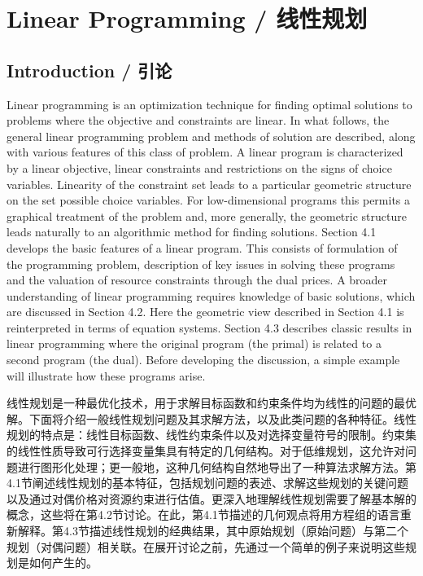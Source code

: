 
\chapter{Linear Programming / 线性规划}

\section{Introduction / 引论}

\begin{original}
Linear programming is an optimization technique for finding optimal solutions to problems where the objective and constraints are linear. In what follows, the general linear programming problem and methods of solution are described, along with various features of this class of problem. A linear program is characterized by a linear objective, linear constraints and restrictions on the signs of choice variables. Linearity of the constraint set leads to a particular geometric structure on the set possible choice variables. For low-dimensional programs this permits a graphical treatment of the problem and, more generally, the geometric structure leads naturally to an algorithmic method for finding solutions. Section 4.1 develops the basic features of a linear program. This consists of formulation of the programming problem, description of key issues in solving these programs and the valuation of resource constraints through the dual prices. A broader understanding of linear programming requires knowledge of basic solutions, which are discussed in Section 4.2. Here the geometric view described in Section 4.1 is reinterpreted in terms of equation systems. Section 4.3 describes classic results in linear programming where the original program (the primal) is related to a second program (the dual). Before developing the discussion, a simple example will illustrate how these programs arise.
\end{original}
\begin{translation}
线性规划是一种最优化技术，用于求解目标函数和约束条件均为线性的问题的最优解。下面将介绍一般线性规划问题及其求解方法，以及此类问题的各种特征。线性规划的特点是：线性目标函数、线性约束条件以及对选择变量符号的限制。约束集的线性性质导致可行选择变量集具有特定的几何结构。对于低维规划，这允许对问题进行图形化处理；更一般地，这种几何结构自然地导出了一种算法求解方法。第4.1节阐述线性规划的基本特征，包括规划问题的表述、求解这些规划的关键问题以及通过对偶价格对资源约束进行估值。更深入地理解线性规划需要了解基本解的概念，这些将在第4.2节讨论。在此，第4.1节描述的几何观点将用方程组的语言重新解释。第4.3节描述线性规划的经典结果，其中原始规划（原始问题）与第二个规划（对偶问题）相关联。在展开讨论之前，先通过一个简单的例子来说明这些规划是如何产生的。
\end{translation}

